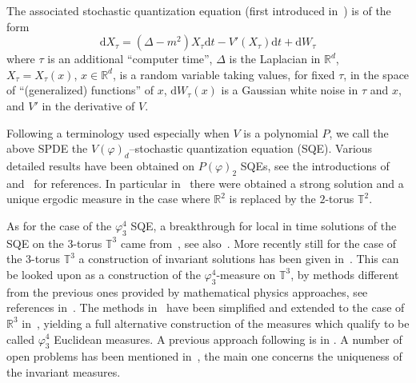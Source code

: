 \documentclass[a4paper,10pt]{article}
\newcommand{\mathd}{\mathrm{d}}
\begin{document}
The associated stochastic quantization equation (first introduced
in~{\cite{parisi_perturbation_1981}}) is of the form
\[ \mathd X_{\tau} = (\Delta - m^2) X_{\tau} \mathd t - V' (X_{\tau}) \mathd
   t + \mathd W_{\tau} \]
where $\tau$ is an additional ``computer time'', $\Delta$ is the Laplacian in
$\mathbb{R}^d$, $X_{\tau} = X_{\tau} (x)$, $x \in \mathbb{R}^d$, is a random
variable taking values, for fixed $\tau$, in the space of ``(generalized)
functions'' of $x$, $\mathd W_{\tau} (x)$ is a Gaussian white noise in $\tau$
and $x$, and $V'$ in the derivative of $V$.

Following a terminology used especially when $V$ is a polynomial $P$, we call
the above SPDE the $V (\varphi)_d$--stochastic quantization equation (SQE).
Various detailed results have been obtained on $P (\varphi)_2$ SQEs, see the
introductions of~{\cite{albeverio_invariant_2017}}
and~{\cite{gubinelli_pde_2018,GH18}} for references. In particular
in~{\cite{da_prato_strong_2003}} there were obtained a strong solution and a
unique ergodic measure in the case where $\mathbb{R}^2$ is replaced by the
$2$-torus $\mathbb{T}^2$.

As for the case of the $\varphi^4_3$ SQE, a breakthrough for local in time
solutions of the SQE on the $3$-torus $\mathbb{T}^3$ came
from~{\cite{Hairer2014}}, see also~{\cite{CaCh,GuImPe}}. More recently still
for the case of the $3$-torus $\mathbb{T}^3$ a construction of invariant
solutions has been given in~{\cite{albeverio_invariant_2017}}. This can be
looked upon as a construction of the $\varphi^4_3$-measure on $\mathbb{T}^3$,
by methods different from the previous ones provided by mathematical physics
approaches, see references in~{\cite{Glimm1987}}. The methods
in~{\cite{albeverio_invariant_2017}} have been simplified and extended to the
case of $\mathbb{R}^3$ in~{\cite{gubinelli_pde_2018}}, yielding a full
alternative construction of the measures which qualify to be called
$\varphi^4_3$ Euclidean measures. A previous approach following
{\cite{Hairer2014}} is in {\cite{MoWe}}. A number of open problems has been
mentioned in~{\cite{albeverio_invariant_2017,gubinelli_pde_2018}}, the main
one concerns the uniqueness of the invariant measures.
\end{document}
